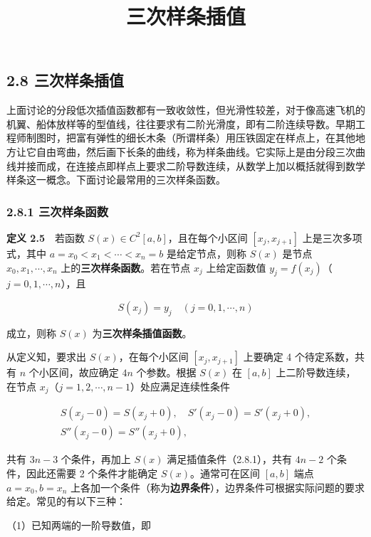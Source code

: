 \documentclass[
  10pt,
  fontset=fandol]{ctexart}
\title{三次样条插值}
\author{}
\date{}
\begin{document}
\maketitle

\subsection{2.8 三次样条插值}\label{ux4e09ux6b21ux6837ux6761ux63d2ux503c}

上面讨论的分段低次插值函数都有一致收敛性，但光滑性较差，对于像高速飞机的机翼、船体放样等的型值线，往往要求有二阶光滑度，即有二阶连续导数。早期工程师制图时，把富有弹性的细长木条（所谓样条）用压铁固定在样点上，在其他地方让它自由弯曲，然后画下长条的曲线，称为样条曲线。它实际上是由分段三次曲线并接而成，在连接点即样点上要求二阶导数连续，从数学上加以概括就得到数学样条这一概念。下面讨论最常用的三次样条函数。

\subsubsection{2.8.1 三次样条函数}\label{ux4e09ux6b21ux6837ux6761ux51fdux6570}

\textbf{定义 2.5}　若函数 \(S(x)\in C^2[a,b]\)，且在每个小区间 \([x_j,x_{j+1}]\) 上是三次多项式，其中 \(a=x_0<x_1<\cdots<x_n=b\) 是给定节点，则称 \(S(x)\) 是节点 \(x_0,x_1,\cdots,x_n\) 上的\textbf{三次样条函数}。若在节点 \(x_j\) 上给定函数值 \(y_j=f(x_j)\)（\(j=0,1,\cdots,n\)），且

\[S(x_j)=y_j\quad(j=0,1,\cdots,n)\tag{2.8.1}\]

成立，则称 \(S(x)\) 为\textbf{三次样条插值函数}。

从定义知，要求出 \(S(x)\)，在每个小区间 \([x_j,x_{j+1}]\) 上要确定 4 个待定系数，共有 \(n\) 个小区间，故应确定 \(4n\) 个参数。根据 \(S(x)\) 在 \([a,b]\) 上二阶导数连续，在节点 \(x_j\)（\(j=1,2,\cdots,n-1\)）处应满足连续性条件

\[\begin{gathered}
S(x_j-0)=S(x_j+0),\quad S'(x_j-0)=S'(x_j+0),\\
S''(x_j-0)=S''(x_j+0),
\end{gathered}\tag{2.8.2}\]

共有 \(3n-3\) 个条件，再加上 \(S(x)\) 满足插值条件（2.8.1），共有 \(4n-2\) 个条件，因此还需要 2 个条件才能确定 \(S(x)\)。通常可在区间 \([a,b]\) 端点 \(a=x_0,b=x_n\) 上各加一个条件（称为\textbf{边界条件}），边界条件可根据实际问题的要求给定。常见的有以下三种：

（1）已知两端的一阶导数值，即
\end{document}
